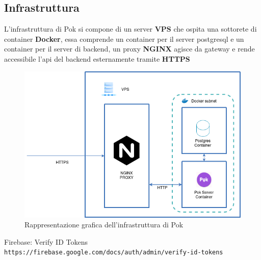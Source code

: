\documentclass[a4paper]{article}
\begin{document}
\subsection{Infrastruttura}

L'infrastruttura di Pok si compone di un server \textbf{VPS} che ospita una sottorete di container \textbf{Docker}, essa comprende un container per il server postgresql e un container per il server di backend, un proxy \textbf{NGINX} agisce da gateway e rende accessibile l'api del backend esternamente tramite \textbf{HTTPS}


\begin{figure}[h!]
   \centering
   \includegraphics[scale=0.4]{infrastructure} 
   \caption{Rappresentazione grafica dell'infrastruttura di Pok}
\end{figure}

\begin{thebibliography}{9}

Firebase: Verify ID Tokens
\\\texttt{https://firebase.google.com/docs/auth/admin/verify-id-tokens}

\end{thebibliography}
\end{document}
